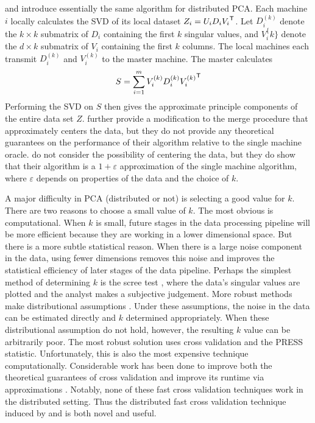 \documentclass[thesis.tex]{subfiles}
\begin{document}
\cite{qu2002principal} and \cite{liang2013distributed} introduce essentially the same algorithm for distributed PCA.
Each machine $i$ locally calculates the SVD of its local dataset $Z_i = U_i D_i {V_i}^{\mathsf{T}}$.
Let $D_i^{(k)}$ denote the $k\times k$ submatrix of $D_i$ containing the first $k$ singular values,
and $V_i^\{k\}$ denote the $d\times k$ submatrix of $V_i$ containing the first $k$ columns.
The local machines each transmit $D_i^{(k)}$ and $V_i^{(k)}$ to the master machine.
The master calculates 
\begin{equation}
    S = \sum_{i=1}^m V_i^{(k)}D_i^{(k)}{V_i^{(k)}}^{\mathsf{T}}
\end{equation}
Performing the SVD on $S$ then gives the approximate principle components of the entire data set $Z$.
\cite{qu2002principal} further provide a modification to the merge procedure that approximately centers the data,
but they do not provide any theoretical guarantees on the performance of their algorithm relative to the single machine oracle.
\cite{liang2013distributed} do not consider the possibility of centering the data,
but they do show that their algorithm is a $1+\varepsilon$ approximation of the single machine algorithm, where $\varepsilon$ depends on properties of the data and the choice of $k$.

A major difficulty in PCA (distributed or not) is selecting a good value for $k$.
There are two reasons to choose a small value of $k$.
The most obvious is computational.
When $k$ is small, future stages in the data processing pipeline will be more efficient because they are working in a lower dimensional space.
But there is a more subtle statistical reason.
When there is a large noise component in the data,
using fewer dimensions removes this noise and improves the statistical efficiency of later stages of the data pipeline.
Perhaps the simplest method of determining $k$ is the scree test \citep{cattell1966scree},
where the data's singular values are plotted and the analyst makes a subjective judgement.
More robust methods make distributional assumptions \citep{bartlett1950tests}.
Under these assumptions, the noise in the data can be estimated directly and $k$ determined appropriately.
When these distributional assumption do not hold, however, the resulting $k$ value can be arbitrarily poor.
The most robust solution uses cross validation and the PRESS statistic.
Unfortunately, this is also the most expensive technique computationally.
Considerable work has been done to improve both the theoretical guarantees of cross validation and improve its runtime via approximations
\citep{wold1978cross,eastment1982cross,krzanowski1987cross,mertens1995efficient,diana2002cross,engelen2004fast,josse2012selecting,camacho2012cross}.
Notably, none of these fast cross validation techniques work in the distributed setting.
Thus the distributed fast cross validation technique induced by \cite{qu2002principal} and \cite{liang2013distributed} is both novel and useful.
\end{document}
